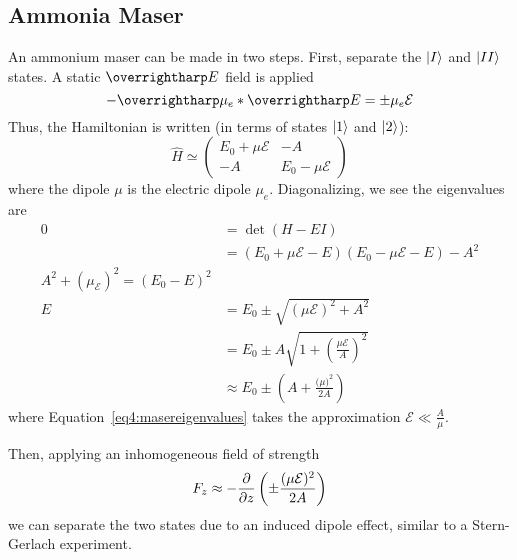 \subsection{Ammonia Maser}
An ammonium maser can be made in two steps. First, separate the \(\lvert I\rangle\) and \(\lvert II\rangle\) states. A static \(\vv{E}\) field is applied
\[-\vv\mu_e*\vv{E}=\pm\mu_e\mathcal{E}\]
Thus, the Hamiltonian is written (in terms of states \(\lvert1\rangle\) and \(\lvert2\rangle\)):
\begin{equation}
	\hat H \simeq \begin{pmatrix}
		E_0+\mu \mathcal{E} & -A \\ -A &E_0-\mu\mathcal{E}
	\end{pmatrix}
\end{equation}
where the dipole \(\mu\) is the electric dipole \(\mu_e\).
Diagonalizing, we see the eigenvalues are
\begin{align}
	0&=\det(H-EI)\nonumber\\
	 &=(E_0+\mu\mathcal{E}-E)(E_0-\mu\mathcal E - E)-A^2\nonumber\\
	 A^2+(\mu_\mathcal{E})^2=(E_0-E)^2\nonumber\\
	E&= E_0\pm\sqrt{(\mu\mathcal{E})^2+A^2}\nonumber\\
	 &=E_0\pm A\sqrt{1+\left(\frac{\mu\mathcal E}{A}\right)^2}\nonumber\\
	 &\approx E_0\pm\left(A+\frac{(\mu\mathcal )^2}{2A}\right)\label{eq4:masereigenvalues}
\end{align}
where Equation~\ref{eq4:masereigenvalues} takes the approximation \(\mathcal E \ll \frac{A}{\mu}\).

Then, applying an inhomogeneous field of strength
\begin{equation}
	F_z\approx -\frac{\partial }{\partial z}\left(\pm\frac{(\mu\mathcal E)^2}{2A}\right)
\end{equation}
we can separate the two states due to an induced dipole effect, similar to a Stern-Gerlach experiment.

